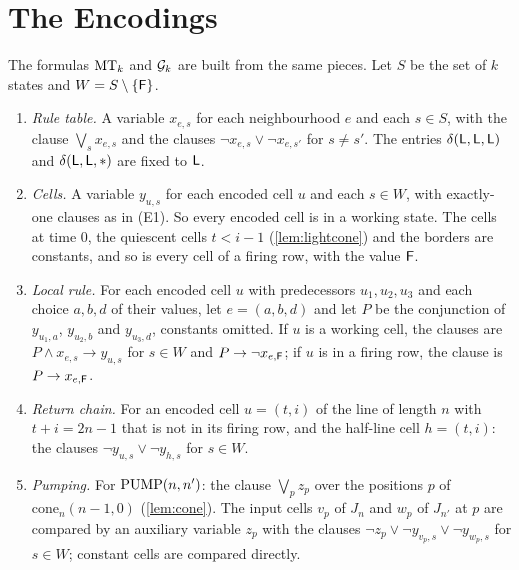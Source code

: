 \appendix
\section{The Encodings}\label{app:encoding}

The formulas $\mathrm{MT}_k$ and $\mathcal G_k$ are built from the same pieces. Let $S$ be
the set of $k$ states and $W=S\setminus\{\mathsf F\}$.
\begin{enumerate}[(E1)]
\item \emph{Rule table.} A variable $x_{e,s}$ for each neighbourhood $e$ and
each $s\in S$, with the clause $\bigvee_s x_{e,s}$ and the clauses $\neg
x_{e,s}\vee\neg x_{e,s'}$ for $s\ne s'$. The entries $\delta(\mathsf L,\mathsf L,\mathsf L)$ and
$\delta(\mathsf L,\mathsf L,\ast)$ are fixed to $\mathsf L$.
\item \emph{Cells.} A variable $y_{u,s}$ for each encoded cell $u$ and each
$s\in W$, with exactly-one clauses as in (E1). So every encoded cell is in a
working state. The cells at time $0$, the quiescent cells $t<i-1$
(\cref{lem:lightcone}) and the borders are constants, and so is every cell of a
firing row, with the value $\mathsf F$.
\item \emph{Local rule.} For each encoded cell $u$ with predecessors
$u_1,u_2,u_3$ and each choice $a,b,d$ of their values, let $e=(a,b,d)$ and let
$P$ be the conjunction of $y_{u_1,a}$, $y_{u_2,b}$ and $y_{u_3,d}$, constants
omitted. If $u$ is a working cell, the clauses are $P\wedge x_{e,s}\to y_{u,s}$
for $s\in W$ and $P\to\neg x_{e,\mathsf F}$; if $u$ is in a firing row, the clause is
$P\to x_{e,\mathsf F}$.
\item \emph{Return chain.} For an encoded cell $u=(t,i)$ of the line of length
$n$ with $t+i=2n-1$ that is not in its firing row, and the half-line cell
$h=(t,i)$: the clauses $\neg y_{u,s}\vee\neg y_{h,s}$ for $s\in W$.
\item \emph{Pumping.} For $\mathrm{PUMP}(n,n')$: the clause $\bigvee_p z_p$ over the
positions $p$ of $\mathrm{cone}_n(n-1,0)$ (\cref{lem:cone}). The input cells
$v_p$ of $J_n$ and $w_p$ of $J_{n'}$ at $p$ are compared by an auxiliary
variable $z_p$ with the clauses $\neg z_p\vee\neg y_{v_p,s}\vee\neg y_{w_p,s}$
for $s\in W$; constant cells are compared directly.
\end{enumerate}

